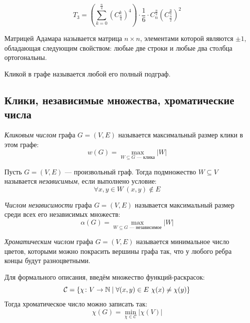 \begin{example}
\[
T_3 = (\sum_{k=0}^{\frac{n}{4}} (C_{\frac{n}{4}}^k)^4) \cdot \frac{1}{6}\cdot C_n^{\frac{n}{2}} (C_{\frac{n}{2}}^{\frac{n}{4}}) ^2
\]
\begin{definition}
    Матрицей Адамара называется матрица $n \times n $, элементами которой являются $\pm 1$, обладающая следующим свойством: любые две строки и любые два столбца ортогональны. 
\end{definition}

\begin{definition}
    Кликой в графе называется любой его полный подграф.
\end{definition}

\end{example}

\subsection{Клики, независимые множества, хроматические числа}

\begin{definition}
	\textit{Кликовым числом} графа $G = (V, E)$ называется максимальный размер клики в этом графе:
	\[
		w(G) = \max_{W \subseteq G \text{ --- клика}} |W|
	\]
\end{definition}

\begin{definition}
	Пусть $G = (V, E)$ --- произвольный граф. Тогда подмножество $W \subseteq V$ называется \textit{независимым}, если выполнено условие:
	\[
		\forall x, y \in W\ (x, y) \notin E
	\]
\end{definition}

\begin{definition}
	\textit{Числом независимости} графа $G = (V, E)$ называется максимальный размер среди всех его независимых множеств:
	\[
		\alpha(G) = \max_{W \subseteq G \text{ --- независимое}} |W|
	\]
\end{definition}

\begin{definition}
	\textit{Хроматическим числом} графа $G = (V, E)$ называется минимальное число цветов, которыми можно покрасить вершины графа так, что у любого ребра концы будут разноцветными.
	
	Для формального описания, введём множество функций-раскрасок:
	\[
		\mathcal{C} = \{\chi \colon V \to \mathbb{N} \mid \forall (x, y) \in E\ \chi(x) \neq \chi(y)\}
	\]
	Тогда хроматическое число можно записать так:
	\[
		\chi(G) = \min_{\chi \in \mathcal{C}} | \chi(V)|
	\]
\end{definition}

